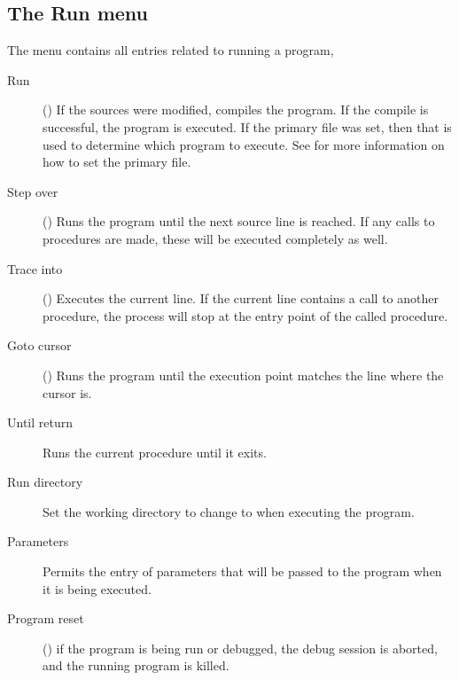 \subsection{The Run menu}
\label{se:menurun}
The  menu contains all entries related to running a program,
\begin{description}
\item[Run] ()
If the sources were modified, compiles the program. If the compile is
successful, the program is executed. If the primary file  was set, then
that is used to determine which program to execute. See 
for more information on how to set the primary file.
\item[Step over] ()
Runs the program until the next source line is reached. If any calls to
procedures are made, these will be executed completely as well.
\item[Trace into] ()
Executes the current line. If the current line contains a call to another
procedure, the process will stop at the entry point of the called procedure.
\item[Goto cursor] ()
Runs the program until the execution point matches the line where the cursor
is.
\item[Until return] Runs the current procedure until it exits.
\item[Run directory] Set the working directory to change to when 
executing the program.
\item[Parameters]
Permits the entry of parameters that will be passed to the program when 
it is being executed.
\item[Program reset] () if the program is being run or
debugged, the debug session is aborted, and the running program is killed.
\end{description}
%
%
